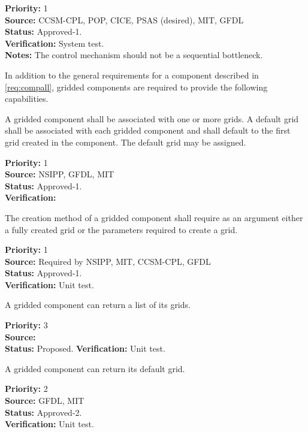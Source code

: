 \begin{reqlist}
{\bf Priority:} 1 \\ 
{\bf Source:}  CCSM-CPL, POP, CICE, PSAS (desired), MIT, GFDL \\
{\bf Status:} Approved-1. \\
{\bf Verification:} System test.\\ 
{\bf Notes:}  The control mechanism should not be a sequential bottleneck.
\end{reqlist}


In addition to the general requirements for  a component described in 
\ref{req:compall}, gridded components are required to provide the
following capabilities.

A gridded component shall be associated with one or more grids.
A default grid shall be associated with 
each gridded component and shall default to the first grid created 
in the component.  The default grid may be assigned.
\begin{reqlist}
{\bf Priority:} 1\\
{\bf Source:} NSIPP, GFDL, MIT \\
{\bf Status:} Approved-1.\\
{\bf Verification:} 
\end{reqlist}

The creation method of a gridded component shall require as an 
argument either a fully created grid or the parameters
required to create a grid.
\begin{reqlist}
{\bf Priority:} 1\\
{\bf Source:} Required by NSIPP, MIT, CCSM-CPL, GFDL \\
{\bf Status:} Approved-1. \\
{\bf Verification:} Unit test.
\end{reqlist}


A gridded component can return a list of its grids.
\begin{reqlist}
{\bf Priority:} 3\\
{\bf Source:} \\
{\bf Status:} Proposed.
{\bf Verification:} Unit test.
\end{reqlist}

A gridded component can return its default grid.
\begin{reqlist}
{\bf Priority:} 2\\
{\bf Source:} GFDL, MIT\\
{\bf Status:} Approved-2.\\
{\bf Verification:} Unit test.
\end{reqlist}

